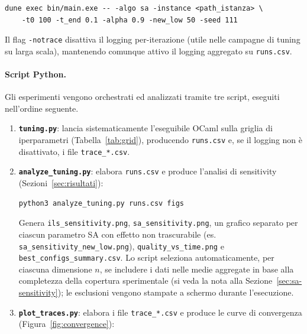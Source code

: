 \documentclass[11pt,a4paper]{article}
\begin{document}
\begin{verbatim}
dune exec bin/main.exe -- -algo sa -instance <path_istanza> \
    -t0 100 -t_end 0.1 -alpha 0.9 -new_low 50 -seed 111
\end{verbatim}

Il flag \verb|-notrace| disattiva il logging per-iterazione (utile nelle
campagne di tuning su larga scala), mantenendo comunque attivo il logging
aggregato su \verb|runs.csv|.

\paragraph{Script Python.}
Gli esperimenti vengono orchestrati ed analizzati tramite tre script, eseguiti
nell'ordine seguente.

\begin{enumerate}
    \item \textbf{\texttt{tuning.py}}: lancia sistematicamente l'eseguibile
          OCaml sulla griglia di iperparametri (Tabella~\ref{tab:grid}),
          producendo \verb|runs.csv| e, se il logging non è disattivato, i
          file \verb|trace_*.csv|.

    \item \textbf{\texttt{analyze\_tuning.py}}: elabora \verb|runs.csv| e
          produce l'analisi di sensitivity (Sezioni~\ref{sec:risultati}):

\begin{verbatim}
python3 analyze_tuning.py runs.csv figs
\end{verbatim}

          Genera \verb|ils_sensitivity.png|, \verb|sa_sensitivity.png|, un
          grafico separato per ciascun parametro SA con effetto non
          trascurabile (es. \verb|sa_sensitivity_new_low.png|),
          \verb|quality_vs_time.png| e \verb|best_configs_summary.csv|. Lo
          script seleziona automaticamente, per ciascuna dimensione $n$, se
          include\-re i dati nelle medie aggregate in base alla completezza
          della copertura sperimentale (si veda la nota alla
          Sezione~\ref{sec:sa-sensitivity}); le esclusioni vengono
          stampate a schermo durante l'esecuzione.

    \item \textbf{\texttt{plot\_traces.py}}: elabora i file \verb|trace_*.csv|
          e produce le curve di convergenza (Figura~\ref{fig:convergence}):


\end{enumerate}
\end{document}
